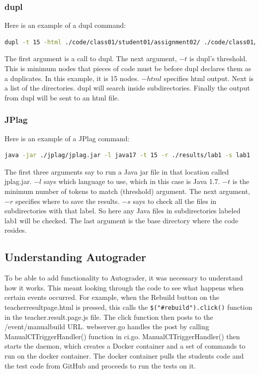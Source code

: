 \documentclass[12pt]{article}
\begin{document}
			\subsubsection{dupl}
			Here is an example of a dupl command:
			\begin{lstlisting}[language=bash, breaklines=true]
dupl -t 15 -html ./code/class01/student01/assignment02/ ./code/class01/student02/assignment02/ ./code/class01/student03/assignment02/ > assignment02.html &
			\end{lstlisting}
			\noindent The first argument is a call to dupl. The next argument, $-t$ is dupl's threshold. This is minimum nodes that pieces of code must be before dupl declares them as a duplicates. In this example, it is 15 nodes. $-html$ specifies html output. Next is a list of the directories. dupl will search inside subdirectories. Finally the output from dupl will be sent to an html file.
			
			\subsubsection{JPlag}
			Here is an example of a JPlag command:
			\begin{lstlisting}[language=bash, breaklines=true]		
java -jar ./jplag/jplag.jar -l java17 -t 15 -r ./results/lab1 -s lab1 ./students
			\end{lstlisting}
			\noindent The first three arguments say to run a Java jar file in that location called jplag.jar. $-l$ says which language to use, which in this case is Java 1.7. $-t$ is the minimum number of tokens to match (threshold) argument. The next argument, $-r$ specifies where to save the results. $-s$ says to check all the files in subdirectories with that label. So here any Java files in subdirectories labeled lab1 will be checked. The last argument is the base directory where the code resides.		
			
		\subsection{Understanding Autograder}
			To be able to add functionality to Autograder, it was necessary to understand how it works. This meant looking through the code to see what happens when certain events occurred. For example, when the Rebuild button on the teacherresultpage.html is pressed, this calls the \verb|$("#rebuild").click()| function in the teacher.result.page.js file. The click function then posts to the /event/manualbuild URL. webserver.go handles the post by calling ManualCITriggerHandler() function in ci.go. ManualCITriggerHandler() then starts the daemon, which creates a Docker container and a set of commands to run on the docker container. The docker container pulls the students code and the test code from GitHub and proceeds to run the tests on it.	
			
\end{document}
